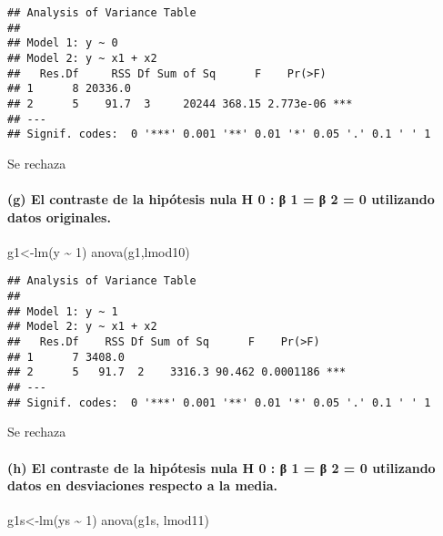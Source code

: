 \documentclass[
]{article}
\newenvironment{Shaded}{\begin{snugshade}}{\end{snugshade}}
\newcommand{\DecValTok}[1]{\textcolor[rgb]{0.00,0.00,0.81}{#1}}
\newcommand{\FunctionTok}[1]{\textcolor[rgb]{0.00,0.00,0.00}{#1}}
\newcommand{\NormalTok}[1]{#1}
\newcommand{\OtherTok}[1]{\textcolor[rgb]{0.56,0.35,0.01}{#1}}
\newcommand{\SpecialCharTok}[1]{\textcolor[rgb]{0.00,0.00,0.00}{#1}}
\begin{document}
\begin{verbatim}
## Analysis of Variance Table
## 
## Model 1: y ~ 0
## Model 2: y ~ x1 + x2
##   Res.Df     RSS Df Sum of Sq      F    Pr(>F)    
## 1      8 20336.0                                  
## 2      5    91.7  3     20244 368.15 2.773e-06 ***
## ---
## Signif. codes:  0 '***' 0.001 '**' 0.01 '*' 0.05 '.' 0.1 ' ' 1
\end{verbatim}

Se rechaza

\hypertarget{g-el-contraste-de-la-hipuxf3tesis-nula-h-0-ux3b2-1-ux3b2-2-0-utilizando-datos-originales.}{%
\paragraph{(g) El contraste de la hipótesis nula H 0 : β 1 = β 2 = 0
utilizando datos
originales.}\label{g-el-contraste-de-la-hipuxf3tesis-nula-h-0-ux3b2-1-ux3b2-2-0-utilizando-datos-originales.}}

\begin{Shaded}
\begin{Highlighting}[]
\NormalTok{g1}\OtherTok{\textless{}{-}}\FunctionTok{lm}\NormalTok{(y }\SpecialCharTok{\textasciitilde{}} \DecValTok{1}\NormalTok{)}
\FunctionTok{anova}\NormalTok{(g1,lmod10)}
\end{Highlighting}
\end{Shaded}

\begin{verbatim}
## Analysis of Variance Table
## 
## Model 1: y ~ 1
## Model 2: y ~ x1 + x2
##   Res.Df    RSS Df Sum of Sq      F    Pr(>F)    
## 1      7 3408.0                                  
## 2      5   91.7  2    3316.3 90.462 0.0001186 ***
## ---
## Signif. codes:  0 '***' 0.001 '**' 0.01 '*' 0.05 '.' 0.1 ' ' 1
\end{verbatim}

Se rechaza

\hypertarget{h-el-contraste-de-la-hipuxf3tesis-nula-h-0-ux3b2-1-ux3b2-2-0-utilizando-datos-en-desviaciones-respecto-a-la-media.}{%
\paragraph{(h) El contraste de la hipótesis nula H 0 : β 1 = β 2 = 0
utilizando datos en desviaciones respecto a la
media.}\label{h-el-contraste-de-la-hipuxf3tesis-nula-h-0-ux3b2-1-ux3b2-2-0-utilizando-datos-en-desviaciones-respecto-a-la-media.}}

\begin{Shaded}
\begin{Highlighting}[]
\NormalTok{g1s}\OtherTok{\textless{}{-}}\FunctionTok{lm}\NormalTok{(ys }\SpecialCharTok{\textasciitilde{}} \DecValTok{1}\NormalTok{)}
\FunctionTok{anova}\NormalTok{(g1s, lmod11)}
\end{Highlighting}
\end{Shaded}
\end{document}
